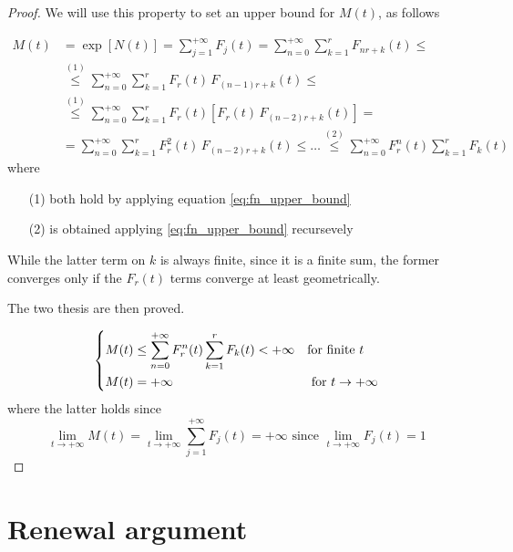 \begin{proof}
	We will use this property to set an upper bound for $M(t)$, as follows

	\begin{equation} \label{eq:mt_convergence}
		\begin{split}
			M(t) &= \exp[N(t)] = \sum\limits_{j=1}^{+\infty} F_j(t) = \sum\limits_{n=0}^{+\infty} \sum\limits_{k=1}^{r} F_{n r + k}(t) \le \\
			& \stackrel{(1)}{\le} \sum\limits_{n=0}^{+\infty} \sum\limits_{k=1}^{r} F_r(t) \, F_{(n-1) r + k}(t) \le \\
			& \stackrel{(1)}{\le} \sum\limits_{n=0}^{+\infty} \sum\limits_{k=1}^{r} F_r(t) \left[ F_r(t) \, F_{(n-2) r + k}(t) \right] = \\
			& = \sum\limits_{n=0}^{+\infty} \sum\limits_{k=1}^{r} F^2_r(t) \, F_{(n-2) r + k}(t) \le \ldots \stackrel{(2)}{\le} \sum\limits_{n=0}^{+\infty} F^n_r(t) \sum\limits_{k=1}^{r} F_k(t)
		\end{split}
	\end{equation}
	where
	\begin{itemize}
		\item[(1)] both hold by applying equation \eqref{eq:fn_upper_bound}
		\item[(2)] is obtained applying \eqref{eq:fn_upper_bound} recursevely
	\end{itemize}

	While the latter term on $k$ is always finite, since it is a finite sum, the former converges only if the $F_r(t)$ terms converge at least geometrically.

	The two thesis are then proved.

	\begin{equation}
		\begin{dcases}
			M(t) \le \sum\limits_{n=0}^{+\infty} F^n_r(t) \sum\limits_{k=1}^{r} F_k(t) < + \infty & \text{for finite } t \\
			M(t) = +\infty & \text{ for } t \to +\infty
		\end{dcases}
	\end{equation}
	where the latter holds since
	$$ \lim_{t \to +\infty}M(t) = \lim_{t \to +\infty} \sum\limits_{j=1}^{+\infty} F_j(t) = +\infty \text{ since } \lim_{t \to +\infty} F_j(t) = 1 $$
\end{proof}

\section{Renewal argument}


